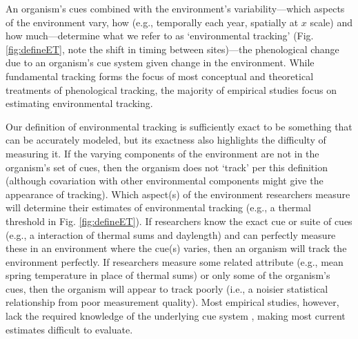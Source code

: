 \documentclass[11pt,letterpaper]{article}
\begin{document}
An organism's cues combined with the environment's variability---which aspects of the environment vary, how (e.g., temporally each year, spatially at $x$ scale) and how much---determine what we refer to as `environmental tracking' (Fig. \ref{fig:defineET}, note the shift in timing between sites)---the phenological change due to an organism's cue system given change in the environment. While fundamental tracking forms the focus of most conceptual and theoretical treatments of phenological tracking, the majority of  empirical studies focus on estimating environmental tracking. 

Our definition of environmental tracking is sufficiently exact to be something that can be accurately modeled,  but its exactness also highlights the difficulty of measuring it. If the varying components of the environment are not in the organism's set of cues, then the organism does not `track' per this definition (although covariation with other environmental components might give the appearance of tracking).  Which aspect(s) of the environment researchers measure will determine their estimates of environmental tracking (e.g., a thermal threshold in Fig. \ref{fig:defineET}). If researchers know the exact cue or suite of cues (e.g., a interaction of thermal sums and daylength) and can perfectly measure these in an environment where the cue(s) varies, then an organism will track the environment perfectly. If researchers measure some related attribute (e.g., mean spring temperature in place of thermal sums) or only some of the organism's cues, then the organism will appear to track poorly (i.e., a noisier statistical relationship from poor measurement quality). Most empirical studies, however, lack the required knowledge of the underlying cue system \citep{chmura2019}, making most current estimates difficult to evaluate. %
\end{document}
